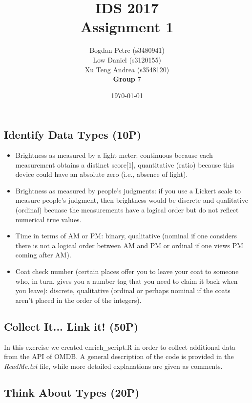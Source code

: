 \documentclass[a4paper]{article}
\title{IDS 2017 \\Assignment 1}
\author{
 Bogdan Petre (s3480941) \\ 
 Low Daniel (s3120155) \\
 Xu Teng Andrea (s3548120) 
 \\ \textbf{Group} 7}
\date{\today}
\begin{document}
\maketitle
\section{}
\subsection{Identify Data Types (10P)}

	\begin{itemize}
		\item Brightness as measured by a light meter: continuous because each measurement obtains a distinct score[1], quantitative (ratio) because this device could have an absolute zero (i.e., absence of light). 
		
		\item Brightness as measured by people’s judgments: if you use a Lickert scale to measure people’s judgment, then brightness would be discrete and qualitative (ordinal) becuase the measurements have a logical order but do not reflect numerical true values.  
		
		\item Time in terms of AM or PM: binary, qualitative (nominal if one considers there is not a logical order between AM and PM or ordinal if one views PM coming after AM).
		
		\item Coat check number (certain places offer you to leave your coat to someone who, in turn, gives
		you a number tag that you need to claim it back when you leave): discrete, qualitative (ordinal or perhaps nominal if the coats aren’t placed in the order of the integers).
	\end{itemize}

	\subsection{Collect It... Link it! (50P)}
	
	In this exercise we created enrich\_script.R in order to collect additional data from the API of OMDB. A general description of the code is provided in the \textit{ReadMe.txt} file, while more detailed explanations are given as comments.
	
	\subsection{Think About Types (20P)}
	
\end{document}
